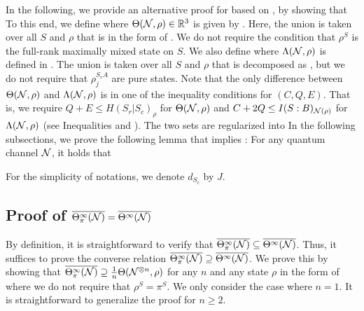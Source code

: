 \documentclass[journal]{IEEEtran}
\begin{document}
\begin{lmm}
\begin{lmm}
In the following, we provide an alternative proof for  based on , by showing that 
To this end, 
we define
where $\Theta({\mathcal N},\rho)\in{\mathbb R}^3$ is given by . 
Here, the union is taken over all $S$ and $\rho$ that is in the form of .
We do not require the condition that $\rho^S$ is the full-rank maximally mixed state on $S$.
We also define
where $\Lambda({\mathcal N},\rho)$ is defined in .
The union is taken over all $S$ and $\rho$ that is decomposed as , 
but we do not require that $\rho_j^{S_rA}$ are pure states.
Note that the only difference between $\Theta({\mathcal N},\rho)$ and $\Lambda({\mathcal N},\rho)$ is in one of the inequality conditions for $(C,Q,E)$. That is, we require $Q+E\leq H(S_r|S_c)_\rho$ for $\Theta({\mathcal N},\rho)$ and $C+2Q\leq I(S:B)_{{\mathcal N}(\rho)}$ for $\Lambda({\mathcal N},\rho)$ (see Inequalities  and ).
The two sets are regularized into
In the following subsections,
we prove the following lemma that implies :
For any quantum channel ${\mathcal N}$, it holds that
\eprp


For the simplicity of notations, we denote $d_{S_c}$ by $J$.



\subsection{Proof of $\overline{\Theta_{\pi}^{\infty}({\mathcal N})}=\overline{\Theta^{\infty}({\mathcal N})}$}


By definition, it is straightforward to verify that $\overline{\Theta_{\pi}^{\infty}({\mathcal N})}\subseteq\overline{\Theta^{\infty}({\mathcal N})}$.
Thus, 
it suffices to prove the converse relation $\overline{\Theta_{\pi}^{\infty}({\mathcal N})}\supseteq\overline{\Theta^{\infty}({\mathcal N})}$.
We prove this by showing that
$\overline{\Theta_{\pi}^{\infty}({\mathcal N})}\supseteq\frac{1}{n}\Theta({\mathcal N}^{\otimes n},\rho)$ for any $n$ and any state $\rho$
in the form of
where we do not require that $\rho^{S}=\pi^{S}$.
We only consider the case where $n=1$. It is straightforward to generalize the proof for $n\geq2$.
 




\end{lmm}
\end{lmm}
\end{document}
